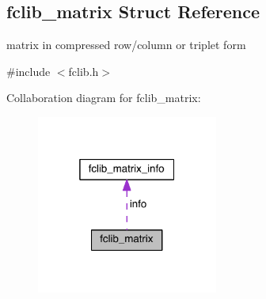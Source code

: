 \hypertarget{structfclib__matrix}{}\subsection{fclib\+\_\+matrix Struct Reference}
\label{structfclib__matrix}


matrix in compressed row/column or triplet form  




{\ttfamily \#include $<$fclib.\+h$>$}



Collaboration diagram for fclib\+\_\+matrix\+:\nopagebreak
\begin{figure}[H]
\begin{center}
\leavevmode
\includegraphics[width=169pt]{structfclib__matrix__coll__graph}
\end{center}
\end{figure}
